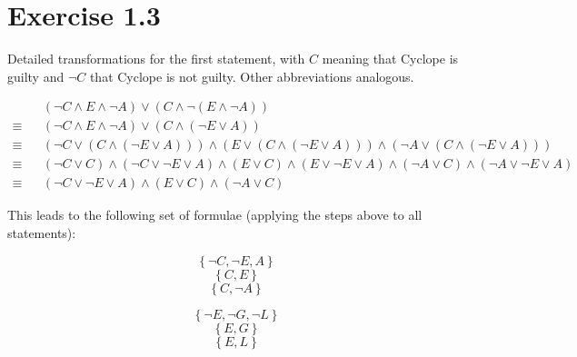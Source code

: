 \documentclass[a4paper]{article}
\begin{document}
\pagebreak


\section{Exercise 1.3}

Detailed transformations for the first statement, with $C$ meaning that Cyclope is guilty and
$\lnot C$ that Cyclope is not guilty. Other abbreviations analogous.


\begin{equation*}
\begin{aligned}
           & & \left( \lnot C \land E \land \lnot A \right) \lor \left( C \land \lnot \left( E \land \lnot A \right) \right) \\
    \equiv & & \left( \lnot C \land E \land \lnot A \right) \lor \left( C \land \left( \lnot E \lor A \right) \right) \\
    \equiv & & \left( \lnot C \lor \left( C \land \left( \lnot E \lor A \right) \right) \right)
               \land \left( E \lor \left( C \land \left( \lnot E \lor A \right) \right) \right)
               \land \left( \lnot A \lor \left( C \land \left( \lnot E \lor A \right) \right) \right) \\
    \equiv & & \left( \lnot C \lor C \right) \land \left( \lnot C \lor \lnot E \lor A \right)
               \land \left( E \lor C \right) \land \left( E \lor \lnot E \lor A \right)
               \land \left( \lnot A \lor C \right) \land \left( \lnot A \lor \lnot E \lor A \right) \\
    \equiv & & \left( \lnot C \lor \lnot E \lor A \right) \land \left( E \lor C \right) \land \left( \lnot A \lor C \right)
\end{aligned}
\end{equation*}

This leads to the following set of formulae (applying the steps above to all statements):

\begin{equation}
 \left\{ \lnot C , \lnot E , A \right\} \tag{1.1} \label{1.1}
\end{equation}
\begin{equation}
\left\{ C , E \right\} \tag{1.2} \label{1.2}
\end{equation}
\begin{equation}
\left\{ C , \lnot A \right\} \tag{1.3} \label{1.3}
\end{equation}

\begin{equation}
 \left\{ \lnot E , \lnot G , \lnot L \right\} \tag{2.1} \label{2.1}
\end{equation}
\begin{equation}
\left\{ E , G \right\} \tag{2.2} \label{2.2}
\end{equation}
\begin{equation}
\left\{ E , L \right\} \tag{2.3} \label{2.3}
\end{equation}
\end{document}
